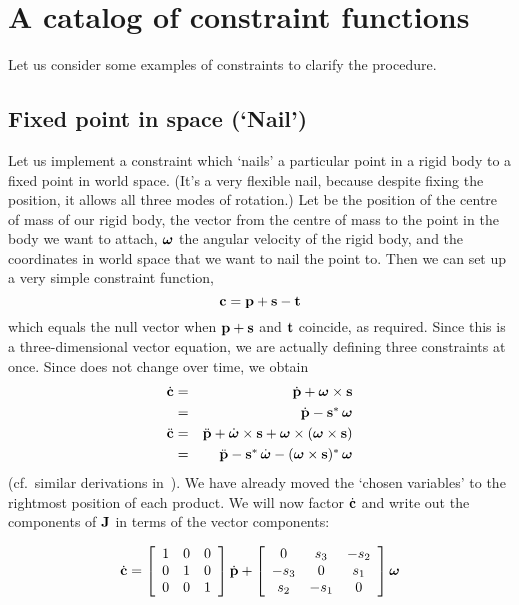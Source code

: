 \section{A catalog of constraint functions\label{constraintAppendix}}

Let us consider some examples of constraints to clarify the procedure.

\subsection{Fixed point in space (`Nail')\label{constrNail}}

Let us implement a constraint which `nails' a particular point in a rigid body to a fixed point
in world space. (It's a very flexible nail, because despite fixing the position, it allows all
three modes of rotation.) Let  be the position of the centre of mass of our rigid
body,  the vector from the centre of mass to the point in the body we want to attach,
$\ve{\omega}$ the angular velocity of the rigid body, and  the coordinates in world
space that we want to nail the point to. Then we can set up a very simple constraint function,
\begin{equation}
\ve{c} = \ve{p} + \ve{s} - \ve{t}
\end{equation}
which equals the null vector when $\ve{p}+\ve{s}$ and $\ve{t}$ coincide, as required.
Since this is a three-dimensional vector equation, we are actually defining three constraints
at once. Since  does not change over time, we obtain
\begin{eqnarray}
\dot{\ve{c}} &=& \dot{\ve{p}} + \ve{\omega}\times\ve{s} \nonumber\\
&=& \dot{\ve{p}} - \dual{\ve{s}}\,\ve{\omega} \\
\ddot{\ve{c}} &=& \ddot{\ve{p}} + \dot{\ve{\omega}}\times\ve{s} +
    \ve{\omega}\times(\ve{\omega}\times\ve{s}) \nonumber\\
&=& \ddot{\ve{p}} - \dual{\ve{s}}\,\dot{\ve{\omega}} -
    \dual{(\ve{\omega}\times\ve{s})}\,\ve{\omega}
\end{eqnarray}
(cf.\ similar derivations in~\cite{Kalra:95}). We have already moved the `chosen variables' to
the rightmost position of each product. We will now factor $\dot{\ve{c}}$ and write out the
components of $\m{J}$ in terms of the vector components:

\begin{equation}
\label{constrEx1J}
\dot{\ve{c}} = \left[\begin{array}{ccc} 1&0&0\\0&1&0\\0&0&1 \end{array}\right]
    \dot{\ve{p}} + \left[\begin{array}{ccc}
    0 & s_3 & -s_2 \\ -s_3 & 0 & s_1 \\ s_2 & -s_1 & 0
    \end{array}\right] \ve{\omega}
\end{equation}

